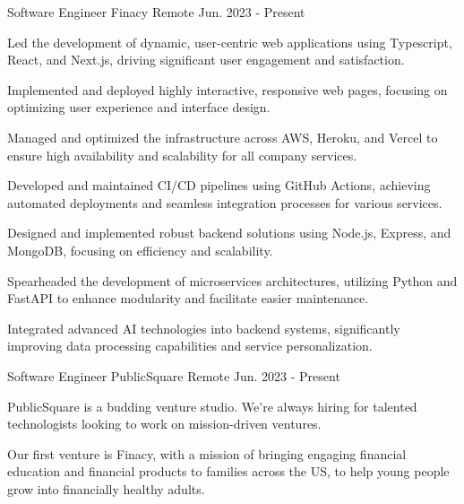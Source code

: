 

\begin{cventries}

\cventry
{Software Engineer} %
{Finacy} %
{Remote} %
{Jun. 2023 - Present} %
{
  \begin{cvitems} %
    \item{Led the development of dynamic, user-centric web applications using Typescript, React, and Next.js, driving significant user engagement and satisfaction.}
    \item{Implemented and deployed highly interactive, responsive web pages, focusing on optimizing user experience and interface design.}
    \item {Managed and optimized the infrastructure across AWS, Heroku, and Vercel to ensure high availability and scalability for all company services.}
    \item{Developed and maintained CI/CD pipelines using GitHub Actions, achieving automated deployments and seamless integration processes for various services.}
    \item{Designed and implemented robust backend solutions using Node.js, Express, and MongoDB, focusing on efficiency and scalability.}
    \item{Spearheaded the development of microservices architectures, utilizing Python and FastAPI to enhance modularity and facilitate easier maintenance.}
    \item{Integrated advanced AI technologies into backend systems, significantly improving data processing capabilities and service personalization.}
  \end{cvitems}
}

\cventry
{Software Engineer} %
{PublicSquare} %
{Remote} %
{Jun. 2023 - Present} %
{
  \begin{cvitems} %
    \item {PublicSquare is a budding venture studio. We're always hiring for talented technologists looking to work on mission-driven ventures.}
    \item {Our first venture is Finacy, with a mission of bringing engaging financial education and financial products to families across the US, to help young people grow into financially healthy adults.}
  \end{cvitems}
}





\end{cventries}
